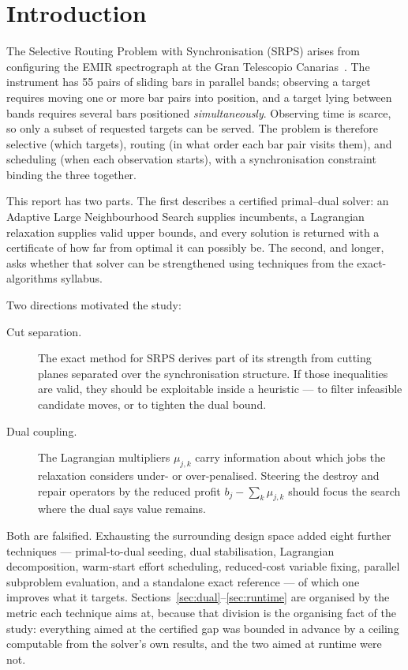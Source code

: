\documentclass[11pt,a4paper]{article}
\begin{document}
\tableofcontents

\section{Introduction}\label{sec:intro}

The Selective Routing Problem with Synchronisation (SRPS) arises from configuring
the EMIR spectrograph at the Gran Telescopio Canarias~\cite{RieraLedesma2021SRPS}.
The instrument has 55 pairs of sliding bars in parallel bands; observing a target
requires moving one or more bar pairs into position, and a target lying between
bands requires several bars positioned \emph{simultaneously}. Observing time is
scarce, so only a subset of requested targets can be served. The problem is
therefore selective (which targets), routing (in what order each bar pair visits
them), and scheduling (when each observation starts), with a synchronisation
constraint binding the three together.

This report has two parts. The first describes a certified primal--dual solver:
an Adaptive Large Neighbourhood Search supplies incumbents, a Lagrangian
relaxation supplies valid upper bounds, and every solution is returned with a
certificate of how far from optimal it can possibly be. The second, and longer,
asks whether that solver can be strengthened using techniques from the
exact-algorithms syllabus.

Two directions motivated the study:

\begin{description}
  \item[Cut separation.] The exact method for SRPS derives part of its
    strength from cutting planes separated over the synchronisation structure. If
    those inequalities are valid, they should be exploitable inside a heuristic
    --- to filter infeasible candidate moves, or to tighten the dual bound.
  \item[Dual coupling.] The Lagrangian multipliers $\mu_{j,k}$ carry
    information about which jobs the relaxation considers under- or
    over-penalised. Steering the destroy and repair operators by the reduced
    profit $b_j-\sum_k \mu_{j,k}$ should focus the search where the dual says
    value remains.
\end{description}

Both are falsified. Exhausting the surrounding design space added eight further
techniques --- primal-to-dual seeding, dual stabilisation, Lagrangian
decomposition, warm-start effort scheduling, reduced-cost variable fixing,
parallel subproblem evaluation, and a standalone exact reference --- of which one
improves what it targets. Sections~\ref{sec:dual}--\ref{sec:runtime} are organised
by the metric each technique aims at, because that division is the organising fact
of the study: everything aimed at the certified gap was bounded in advance by a
ceiling computable from the solver's own results, and the two aimed at runtime
were not.
\end{document}
